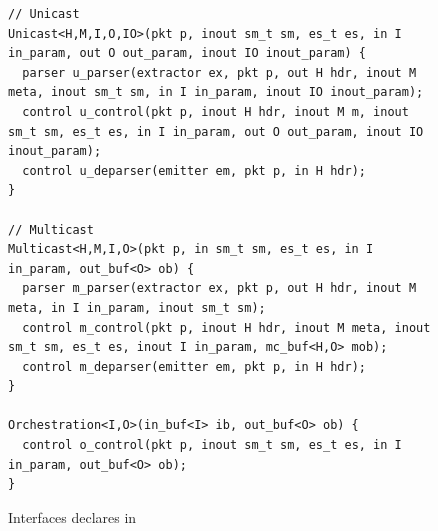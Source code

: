 \documentclass[letterpaper,twocolumn,10pt]{article}
\begin{document}

\begin{figure}[h]
\begin{lstlisting}[frame=none]
// Unicast
Unicast<H,M,I,O,IO>(pkt p, inout sm_t sm, es_t es, in I in_param, out O out_param, inout IO inout_param) {
  parser u_parser(extractor ex, pkt p, out H hdr, inout M meta, inout sm_t sm, in I in_param, inout IO inout_param);
  control u_control(pkt p, inout H hdr, inout M m, inout sm_t sm, es_t es, in I in_param, out O out_param, inout IO inout_param);
  control u_deparser(emitter em, pkt p, in H hdr);                             
}

// Multicast
Multicast<H,M,I,O>(pkt p, in sm_t sm, es_t es, in I in_param, out_buf<O> ob) {
  parser m_parser(extractor ex, pkt p, out H hdr, inout M meta, in I in_param, inout sm_t sm);
  control m_control(pkt p, inout H hdr, inout M meta, inout sm_t sm, es_t es, inout I in_param, mc_buf<H,O> mob);
  control m_deparser(emitter em, pkt p, in H hdr);
}

Orchestration<I,O>(in_buf<I> ib, out_buf<O> ob) {                         
  control o_control(pkt p, inout sm_t sm, es_t es, in I in_param, out_buf<O> ob);
}    
\end{lstlisting}
\caption{Interfaces declares in \uarch}
\label{fig:programmable-blocks-for-interfaces}
\end{figure}
\end{document}
